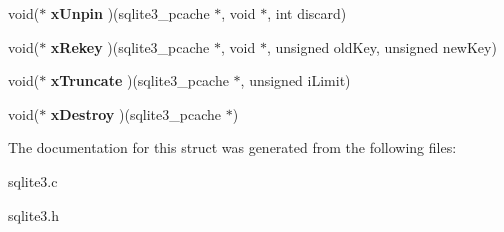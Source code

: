 \begin{DoxyCompactItemize}
\item 
void($\ast$ {\bfseries x\+Unpin} )(sqlite3\+\_\+pcache $\ast$, void $\ast$, int discard)\hypertarget{structsqlite3__pcache__methods_ade2ab50cc6896be03ee86541877fa85e}{}\label{structsqlite3__pcache__methods_ade2ab50cc6896be03ee86541877fa85e}

\item 
void($\ast$ {\bfseries x\+Rekey} )(sqlite3\+\_\+pcache $\ast$, void $\ast$, unsigned old\+Key, unsigned new\+Key)\hypertarget{structsqlite3__pcache__methods_adc5552190f1de86eb95d91e9cf8430e6}{}\label{structsqlite3__pcache__methods_adc5552190f1de86eb95d91e9cf8430e6}

\item 
void($\ast$ {\bfseries x\+Truncate} )(sqlite3\+\_\+pcache $\ast$, unsigned i\+Limit)\hypertarget{structsqlite3__pcache__methods_aad73f9335999770bcd2dc6a2d914b4f0}{}\label{structsqlite3__pcache__methods_aad73f9335999770bcd2dc6a2d914b4f0}

\item 
void($\ast$ {\bfseries x\+Destroy} )(sqlite3\+\_\+pcache $\ast$)\hypertarget{structsqlite3__pcache__methods_aac18fc581d8d63550a6657016c24ba5d}{}\label{structsqlite3__pcache__methods_aac18fc581d8d63550a6657016c24ba5d}

\end{DoxyCompactItemize}


The documentation for this struct was generated from the following files\+:\begin{DoxyCompactItemize}
\item 
sqlite3.\+c\item 
sqlite3.\+h\end{DoxyCompactItemize}
